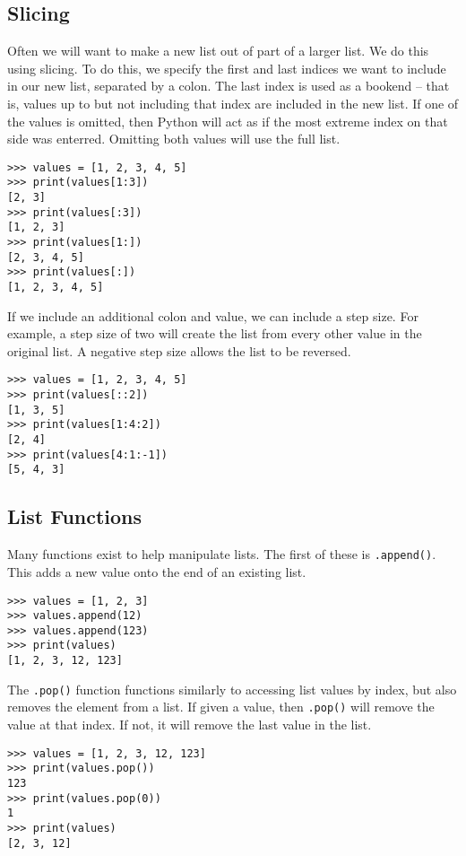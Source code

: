 \documentclass[11pt]{cselabheader}
\begin{document}
\subsection{Slicing}
Often we will want to make a new list out of part of a larger list. We do this using slicing. To do this, we specify the first and last indices we want to include in our new list, separated by a colon. The last index is used as a bookend -- that is, values up to but not including that index are included in the new list. If one of the values is omitted, then Python will act as if the most extreme index on that side was enterred. Omitting both values will use the full list.

\begin{lstlisting}[style=ipython]
>>> values = [1, 2, 3, 4, 5]
>>> print(values[1:3])
[2, 3]
>>> print(values[:3])
[1, 2, 3]
>>> print(values[1:])
[2, 3, 4, 5]
>>> print(values[:])
[1, 2, 3, 4, 5]
\end{lstlisting}

If we include an additional colon and value, we can include a step size. For example, a step size of two will create the list from every other value in the original list. A negative step size allows the list to be reversed.

\begin{lstlisting}[style=ipython]
>>> values = [1, 2, 3, 4, 5]
>>> print(values[::2])
[1, 3, 5]
>>> print(values[1:4:2])
[2, 4]
>>> print(values[4:1:-1])
[5, 4, 3]
\end{lstlisting}

\subsection{List Functions}
Many functions exist to help manipulate lists. The first of these is \lstinline{.append()}. This adds a new value onto the end of an existing list.

\begin{lstlisting}[style=ipython]
>>> values = [1, 2, 3]
>>> values.append(12)
>>> values.append(123)
>>> print(values)
[1, 2, 3, 12, 123]
\end{lstlisting}

The \lstinline{.pop()} function functions similarly to accessing list values by index, but also removes the element from a list. If given a value, then \lstinline{.pop()} will remove the value at that index. If not, it will remove the last value in the list.

\begin{lstlisting}[style=ipython]
>>> values = [1, 2, 3, 12, 123]
>>> print(values.pop())
123
>>> print(values.pop(0))
1
>>> print(values)
[2, 3, 12]
\end{lstlisting}
\end{document}
